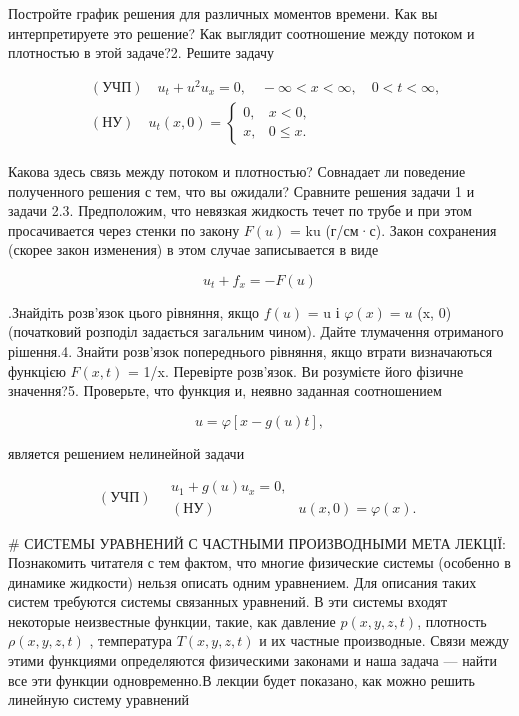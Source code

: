 \documentclass[
  ukrainian,
]{article}
\begin{document}
Постройте график решения для различных моментов времени. Как вы
интерпретируете это решение? Как выглядит соотношение между потоком и
плотностью в этой задаче?2. Решите задачу

\[
\begin{split} & (\text{УЧП}) \quad u_t + u^2 u_x = 0, \quad -\infty < x < \infty, \quad 0 < t < \infty, \\ & (\text{НУ}) \quad u_t(x, 0) = \begin{cases} 0, & x < 0, \\ x, & 0 \leqslant x. \end{cases} \end{split}
\]

Какова здесь связь между потоком и плотностью? Совнадает ли поведение
полученного решения с тем, что вы ожидали? Сравните решения задачи 1 и
задачи 2.3. Предположим, что невязкая жидкость течет по трубе и при этом
просачивается через стенки по закону \(F(u)\) = ku (г/см·с). Закон
сохранения (скорее закон изменения) в этом случае записывается в виде

\[
u_t + f_x = -F(u)
\]

.Знайдіть розв'язок цього рівняння, якщо \(f(u)\) = u і
\(\varphi(x) = u\) (x, 0) (початковий розподіл задається загальним
чином). Дайте тлумачення отриманого рішення.4. Знайти розв'язок
попереднього рівняння, якщо втрати визначаються функцією \(F(x, t)\) =
1/x. Перевірте розв'язок. Ви розумієте його фізичне значення?5.
Проверьте, что функция и, неявно заданная соотношением

\[
u = \varphi[x - g(u) t],
\]

является решением нелинейной задачи

\[
(\text{УЧП}) \quad \begin{array}{ll} u_1 + g(u) u_x = 0, \\ (\text{НУ}) & u(x, 0) = \varphi(x). \end{array}
\]

\# СИСТЕМЫ УРАВНЕНИЙ С ЧАСТНЫМИ ПРОИЗВОДНЫМИ МЕТА ЛЕКЦІЇ: Познакомить
читателя с тем фактом, что многие физические системы (особенно в
динамике жидкости) нельзя описать одним уравнением. Для описания таких
систем требуются системы связанных уравнений. В эти системы входят
некоторые неизвестные функции, такие, как давление \(p(x, y, z, t)\),
плотность \(\rho(x, y, z, t)\) , температура \(T(x, y, z, t)\) и их
частные производные. Связи между этими функциями определяются
физическими законами и наша задача --- найти все эти функции
одновременно.В лекции будет показано, как можно решить линейную систему
уравнений
\end{document}
